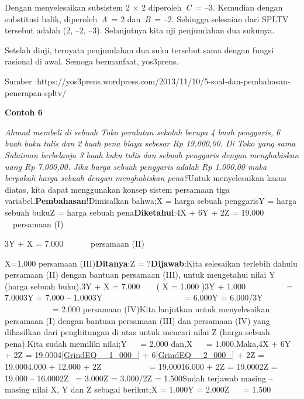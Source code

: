 \documentclass[11pt,fleqn]{book} %
\begin{document}
\noindent 

\noindent 

\noindent Dengan menyelesaikan subsistem 2 $\times$ 2 diperoleh~\textit{C}~= --3. Kemudian dengan substitusi balik, diperoleh~\textit{A}~= 2 dan~\textit{B}~= --2. Sehingga selesaian dari SPLTV tersebut adalah (2, --2, --3). Selanjutnya kita uji penjumlahan dua sukunya.

\noindent 

\noindent Setelah diuji, ternyata penjumlahan dua suku tersebut sama dengan fungsi rasional di awal. Semoga bermanfaat, yos3prens.

\noindent Sumber :https://yos3prens.wordpress.com/2013/11/10/5-soal-dan-pembahasan-penerapan-spltv/

\noindent 

\noindent \textbf{Contoh 6}

\noindent \textit{Ahmad membeli di sebuah Toko peralatan sekolah berupa 4 buah penggaris, 6 buah buku tulis dan 2 buah pena biaya sebesar Rp 19.000,00. Di Toko yang sama Sulaiman berbelanja 3 buah buku tulis dan sebuah penggaris dengan menghabiskan uang Rp 7.000,00. Jika harga sebuah penggaris adalah Rp 1.000,00 maka berpakah harga sebuah dengan menghabiskan pena?}Untuk menyelesaikan kasus diatas, kita dapat menggunakan konsep sistem persamaan tiga variabel.\textbf{Pembahasan}!Dimisalkan bahwa;X = harga sebuah penggarisY = harga sebuah bukuZ = harga sebuah pena\textbf{Diketahui}:4X + 6Y + 2Z      = 19.000 ~ ~~persamaan (I)

\noindent 3Y + X                = 7.000 ~ ~ ~~ persamaan (II)

\noindent X=1.000     persamaan (III)\textbf{Ditanya}:Z = ?\textbf{Dijawab}:Kita selesaikan terlebih dahulu persamaan (II) dengan bantuan persamaan (III), untuk mengetahui nilai Y (harga sebuah buku).3Y + X                  = 7.000 ~ ~  ( X = 1.000 )3Y + 1.000 ~ ~ ~ ~ ~~ = 7.0003Y                         = 7.000 -- 1.0003Y ~ ~ ~ ~ ~ ~ ~ ~ ~ ~ ~~  = 6.000Y                           = 6.000/3Y ~ ~ ~ ~ ~ ~ ~ ~ ~ ~ ~ ~  = 2.000         persamaan (IV)Kita lanjutkan untuk menyelesaikan persamaan (I) dengan bantuan persamaan (III) dan persamaan (IV) yang dihasilkan dari penghitungan di atas untuk mencari nilai Z (harga sebuah pena).Kita sudah memiliki nilai;Y ~ ~= 2.000 dan,X ~ ~= 1.000.Maka,4X + 6Y + 2Z                         = 19.0004\eqref{GrindEQ__1_000_} + 6\eqref{GrindEQ__2_000_} + 2Z        = 19.0004.000 + 12.000 + 2Z ~ ~ ~ ~ ~ ~~  = 19.00016.000 + 2Z                            = 19.0002Z                                           = 19.000 -- 16.0002Z~                                          = 3.000Z                                             = 3.000/2Z                                             = 1.500Sudah terjawab masing -- masing nilai X, Y dan Z sebagai berikut;X    = 1.000Y    = 2.000Z ~~ = 1.500
\end{document}
